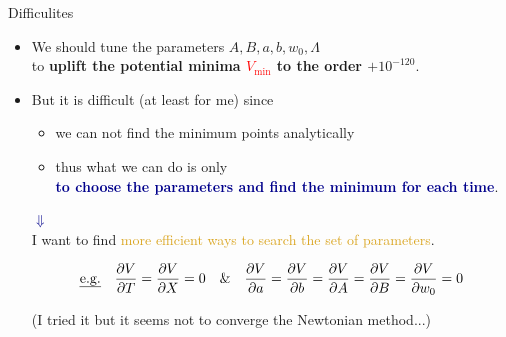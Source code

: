 \documentclass[
  unicode,a4paper,10pt,
  xcolor = {dvipsnames,svgnames},
  hyperref ={colorlinks=true,citecolor=Navy,linkcolor=NavyBlue,urlcolor=purple},
  ja=standard,lualatex
]{beamer}
\begin{document}
\begin{frame}{Difficulites}

  \begin{itemize}
    \item
          We should tune the parameters $A,B,a,b,w_{0},\Lambda$\\
          to \textbf{uplift the potential minima \textcolor{red}{$V_{\mathrm{min}}$} to the order $+10^{-120}$}.

          \pause

    \item
          But it is difficult (at least for me) since
          \begin{itemize}
            \item
                  we can not find the minimum points analytically
            \item
                  thus what we can do is only\\
                  \qquad \textbf{\textcolor{DarkBlue}{to choose the parameters and find the minimum for each time}}.
          \end{itemize}

          \pause

          \begin{center}
            {\huge \textcolor{DarkBlue}{$\Downarrow$}}
            \\
            I want to find \textcolor{Goldenrod}{more efficient ways to search the set of parameters}.
          \end{center}

          \begin{equation}
            \text{\uline{e.g.}}
            \quad
            \pdv{V}{T}
            =
            \pdv{V}{X}
            =
            0
            \quad
            \&
            \quad
            \pdv{V}{a}
            =
            \pdv{V}{b}
            =
            \pdv{V}{A}
            =
            \pdv{V}{B}
            =
            \pdv{V}{w_{0}}
            =
            0
            \nonumber
          \end{equation}
          \begin{center}
            (I tried it but it seems not to converge the Newtonian method...)
          \end{center}

  \end{itemize}

\end{frame}
\end{document}
